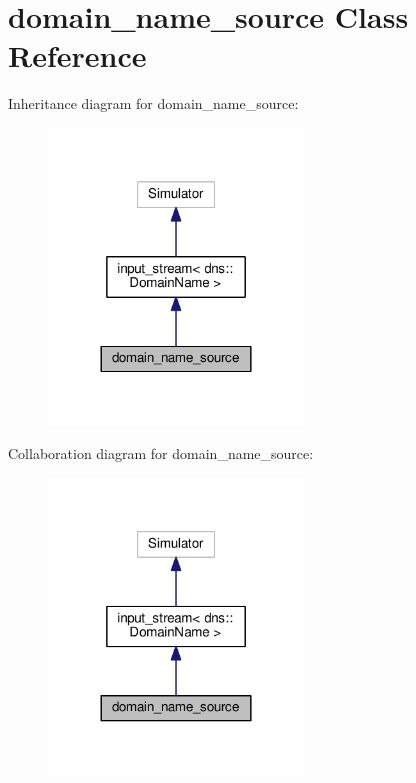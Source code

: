 \hypertarget{classdomain__name__source}{}\section{domain\+\_\+name\+\_\+source Class Reference}
\label{classdomain__name__source}


Inheritance diagram for domain\+\_\+name\+\_\+source\+:\nopagebreak
\begin{figure}[H]
\begin{center}
\leavevmode
\includegraphics[width=192pt]{classdomain__name__source__inherit__graph}
\end{center}
\end{figure}


Collaboration diagram for domain\+\_\+name\+\_\+source\+:\nopagebreak
\begin{figure}[H]
\begin{center}
\leavevmode
\includegraphics[width=192pt]{classdomain__name__source__coll__graph}
\end{center}
\end{figure}
